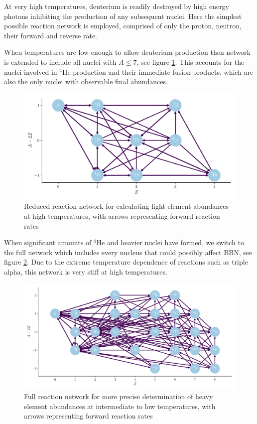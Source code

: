 At very high temperatures, deuterium is readily destroyed by high energy photons inhibiting the production of any subsequent nuclei. Here the simplest possible reaction network is employed, comprised of only the proton, neutron, their forward and reverse rate. 

When temperatures are low enough to allow deuterium production then network is extended to include all nuclei with $A\leq 7$, see figure \ref{fig:smallnet}. This accounts for the nuclei involved in ${}^4$He production and their immediate fusion products, which are also the only nuclei with observable final abundances. 

\begin{figure}[ht]
    \includegraphics[width=5.1in]{figures/lillenet.pdf}
    \caption{Reduced reaction network for calculating light element abundances at high temperatures, with arrows representing forward reaction rates}
    \label{fig:smallnet}
\end{figure}

When significant amounts of ${}^4$He and heavier nuclei have formed, we switch to the full network which includes every nucleus that could possibly affect BBN, see figure \ref{fig:bignet}. Due to the extreme temperature dependence of reactions such as triple alpha, this network is very stiff at high temperatures. 

\begin{figure}[ht]
    \includegraphics[width=5.1in]{figures/stornet.pdf}
    \caption{Full reaction network for more precise determination of heavy element abundances at intermediate to low temperatures, with arrows representing forward reaction rates}
    \label{fig:bignet}
\end{figure}

